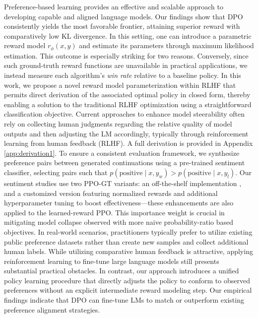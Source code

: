 \begin{lemma}
\begin{theorem}
\begin{lemma}
Preference-based learning provides an effective and scalable approach to developing capable and aligned language models. Our findings show that DPO consistently yields the most favorable frontier, attaining superior reward with comparatively low KL divergence. In this setting, one can introduce a parametric reward model $r_{\phi}(x, y)$ and estimate its parameters through maximum likelihood estimation. This outcome is especially striking for two reasons. Conversely, since such ground-truth reward functions are unavailable in practical applications, we instead measure each algorithm's \textit{win rate} relative to a baseline policy. In this work, we propose a novel reward model parameterization within RLHF that permits direct derivation of the associated optimal policy in closed form, thereby enabling a solution to the traditional RLHF optimization using a straightforward classification objective. Current approaches to enhance model steerability often rely on collecting human judgments regarding the relative quality of model outputs and then adjusting the LM accordingly, typically through reinforcement learning from human feedback (RLHF). A full derivation is provided in Appendix \ref{app:derivation1}. To ensure a consistent evaluation framework, we synthesize preference pairs between generated continuations using a pre-trained sentiment classifier, selecting pairs such that $p(\text{positive}\mid x,y_w)>p(\text{positive}\mid x,y_l)$. Our sentiment studies use two PPO-GT variants: an off-the-shelf implementation \cite{leandro_von_werra_2023_7790115}, and a customized version featuring normalized rewards and additional hyperparameter tuning to boost effectiveness—these enhancements are also applied to the learned-reward PPO. This importance weight is crucial in mitigating model collapse observed with more naive probability-ratio based objectives. In real-world scenarios, practitioners typically prefer to utilize existing public preference datasets rather than create new samples and collect additional human labels. While utilizing comparative human feedback is attractive, applying reinforcement learning to fine-tune large language models still presents substantial practical obstacles. In contrast, our approach introduces a unified policy learning procedure that directly adjusts the policy to conform to observed preferences without an explicit intermediate reward modeling step. Our empirical findings indicate that DPO can fine-tune LMs to match or outperform existing preference alignment strategies. \end{lemma}


\end{theorem}
\end{lemma}
